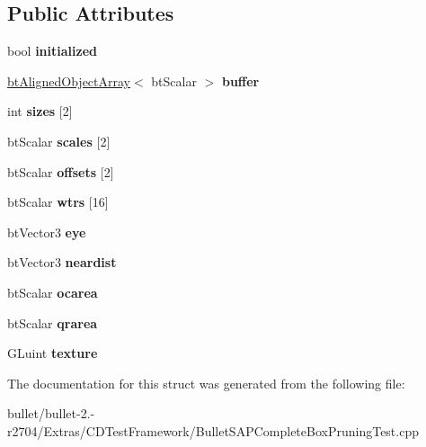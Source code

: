 \subsection*{Public Attributes}
\begin{DoxyCompactItemize}
\item 
\hypertarget{struct_occlusion_buffer_a4526f73f49d596730c812b9035f034b7}{bool {\bfseries initialized}}\label{struct_occlusion_buffer_a4526f73f49d596730c812b9035f034b7}

\item 
\hypertarget{struct_occlusion_buffer_ac6cea9d1214a6d1d12dad0aa2d2ca500}{\hyperlink{classbt_aligned_object_array}{bt\+Aligned\+Object\+Array}$<$ bt\+Scalar $>$ {\bfseries buffer}}\label{struct_occlusion_buffer_ac6cea9d1214a6d1d12dad0aa2d2ca500}

\item 
\hypertarget{struct_occlusion_buffer_ae4b5f154610294f7ca6de621e29dcbb9}{int {\bfseries sizes} \mbox{[}2\mbox{]}}\label{struct_occlusion_buffer_ae4b5f154610294f7ca6de621e29dcbb9}

\item 
\hypertarget{struct_occlusion_buffer_a041fce5f8e68b77917ee1bf0e13d23c3}{bt\+Scalar {\bfseries scales} \mbox{[}2\mbox{]}}\label{struct_occlusion_buffer_a041fce5f8e68b77917ee1bf0e13d23c3}

\item 
\hypertarget{struct_occlusion_buffer_a873c96ad40b1ee850df217f25cb7c45f}{bt\+Scalar {\bfseries offsets} \mbox{[}2\mbox{]}}\label{struct_occlusion_buffer_a873c96ad40b1ee850df217f25cb7c45f}

\item 
\hypertarget{struct_occlusion_buffer_a6c6a2bf102aa7041be3995e50d37a002}{bt\+Scalar {\bfseries wtrs} \mbox{[}16\mbox{]}}\label{struct_occlusion_buffer_a6c6a2bf102aa7041be3995e50d37a002}

\item 
\hypertarget{struct_occlusion_buffer_a1a445ec8207abe2f5abf989d936e11ca}{bt\+Vector3 {\bfseries eye}}\label{struct_occlusion_buffer_a1a445ec8207abe2f5abf989d936e11ca}

\item 
\hypertarget{struct_occlusion_buffer_aed449a6cab2c10894ed0114726c8a591}{bt\+Vector3 {\bfseries neardist}}\label{struct_occlusion_buffer_aed449a6cab2c10894ed0114726c8a591}

\item 
\hypertarget{struct_occlusion_buffer_a07d33591cd7f0d462c94922d8164d06c}{bt\+Scalar {\bfseries ocarea}}\label{struct_occlusion_buffer_a07d33591cd7f0d462c94922d8164d06c}

\item 
\hypertarget{struct_occlusion_buffer_a4baef042dcdbedc16e4ef1642a69b259}{bt\+Scalar {\bfseries qrarea}}\label{struct_occlusion_buffer_a4baef042dcdbedc16e4ef1642a69b259}

\item 
\hypertarget{struct_occlusion_buffer_a02969862d95b615862b13bf77747d97e}{G\+Luint {\bfseries texture}}\label{struct_occlusion_buffer_a02969862d95b615862b13bf77747d97e}

\end{DoxyCompactItemize}


The documentation for this struct was generated from the following file\+:\begin{DoxyCompactItemize}
\item 
bullet/bullet-\/2.-\/r2704/\+Extras/\+C\+D\+Test\+Framework/Bullet\+S\+A\+P\+Complete\+Box\+Pruning\+Test.\+cpp\end{DoxyCompactItemize}
